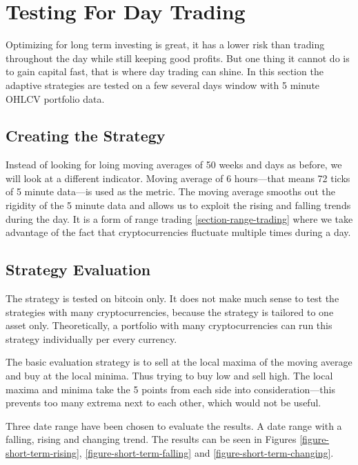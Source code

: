 \section{Testing For Day Trading}
Optimizing for long term investing is great, it has a lower risk than trading throughout the day while still keeping good profits. But one thing it cannot do is to gain capital fast, that is where day trading can shine. In this section the adaptive strategies are tested on a few several days window with 5 minute OHLCV portfolio data.

\subsection*{Creating the Strategy}
Instead of looking for loing moving averages of 50 weeks and days as before, we will look at a different indicator. Moving average of 6 hours---that means 72 ticks of 5 minute data---is used as the metric. The moving average smooths out the rigidity of the 5 minute data and allows us to exploit the rising and falling trends during the day. It is a form of range trading \ref{section-range-trading} where we take advantage of the fact that cryptocurrencies fluctuate multiple times during a day.

\subsection*{Strategy Evaluation}
The strategy is tested on bitcoin only. It does not make much sense to test the strategies with many cryptocurrencies, because the strategy is tailored to one asset only. Theoretically, a portfolio with many cryptocurrencies can run this strategy individually per every currency.

The basic evaluation strategy is to sell at the local maxima of the moving average and buy at the local minima. Thus trying to buy low and sell high. The local maxima and minima take the 5 points from each side into consideration---this prevents too many extrema next to each other, which would not be useful.

Three date range have been chosen to evaluate the results. A date range with a falling, rising and changing trend. The results can be seen in Figures \ref{figure-short-term-rising}, \ref{figure-short-term-falling} and \ref{figure-short-term-changing}.

